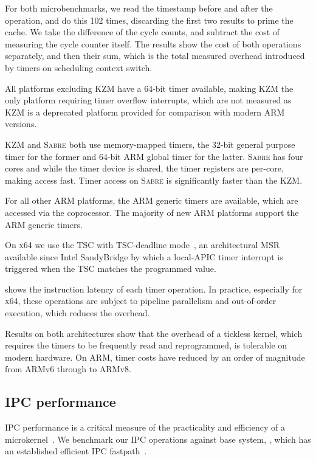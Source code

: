 For both microbenchmarks, we read the timestamp before and after the operation, and do this 102
times, discarding the first two results to prime the cache.  We take the difference of the cycle
counts, and subtract the cost of measuring the cycle counter itself. The results show the cost of
both operations separately, and then their sum, which is the total measured overhead introduced by timers on
scheduling context switch.

All platforms excluding \textsc{KZM} have a 64-bit timer available, making \textsc{KZM} the only
platform requiring timer overflow interrupts, which are not measured as \textsc{KZM} is a deprecated
platform provided for comparison with modern ARM versions.

\textsc{KZM} and \textsc{Sabre} both use memory-mapped timers, the 32-bit general purpose timer for
the former and 64-bit ARM global timer for the latter. \textsc{Sabre} has four cores and while the
timer device is shared, the timer registers are per-core, making access fast. 
Timer access on \textsc{Sabre} is significantly faster than the \textsc{KZM}. 

For all other ARM platforms, the ARM generic timers are available, which are accessed via the
coprocessor. The majority of new ARM platforms support the ARM generic timers. 

On \textsc{x64} we use the \gls{TSC} with \gls{TSC}-deadline
mode~\citep{Intel_64_IA-32:asdmspg_325384}, an architectural \gls{MSR} available since
Intel SandyBridge by which a local-APIC timer interrupt is triggered when the \gls{TSC} matches the
programmed value. 

 shows the instruction latency of each timer operation. In practice, especially
for \textsc{x64}, these operations are subject to pipeline parallelism and out-of-order execution, which
reduces the overhead.

Results on both architectures show that the overhead of a tickless kernel, which requires the timers
to be frequently read and reprogrammed, is tolerable on modern hardware. On ARM, timer costs have
reduced by an order of magnitude from ARMv6 through to ARMv8. 
\clearpage
\subsection{IPC performance}

\Gls{IPC} performance is a critical measure of the practicality and efficiency of a
microkernel~\citep{Liedtke_95}. We benchmark our \gls{IPC} operations against base system, \selfour,
which has an established efficient \gls{IPC} fastpath~\citep{Elphinstone_Heiser_13}. 

